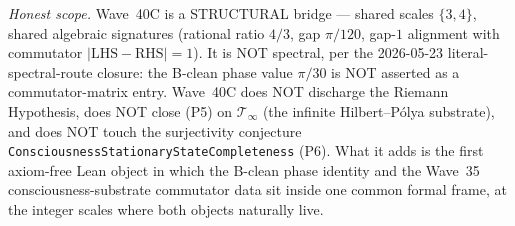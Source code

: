 \begin{remark}
\emph{Honest scope.} Wave~40C is a STRUCTURAL bridge --- shared scales $\{3, 4\}$, shared algebraic signatures (rational ratio $4/3$, gap $\pi/120$, gap-$1$ alignment with commutator $|\mathrm{LHS} - \mathrm{RHS}| = 1$). It is NOT spectral, per the 2026-05-23 literal-spectral-route closure: the B-clean phase value $\pi/30$ is NOT asserted as a commutator-matrix entry. Wave~40C does NOT discharge the Riemann Hypothesis, does NOT close (P5) on $\mathcal{T}_\infty$ (the infinite Hilbert--P\'olya substrate), and does NOT touch the surjectivity conjecture \texttt{ConsciousnessStationaryStateCompleteness} (P6). What it adds is the first axiom-free Lean object in which the B-clean phase identity and the Wave~35 consciousness-substrate commutator data sit inside one common formal frame, at the integer scales where both objects naturally live.
\end{remark}

